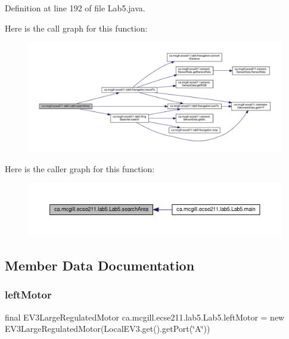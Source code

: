 Definition at line 192 of file Lab5.\+java.

Here is the call graph for this function\+:
\nopagebreak
\begin{figure}[H]
\begin{center}
\leavevmode
\includegraphics[width=350pt]{classca_1_1mcgill_1_1ecse211_1_1lab5_1_1_lab5_a0e80ac0068ef1ab41cfb571b8c65845c_cgraph}
\end{center}
\end{figure}
Here is the caller graph for this function\+:
\nopagebreak
\begin{figure}[H]
\begin{center}
\leavevmode
\includegraphics[width=350pt]{classca_1_1mcgill_1_1ecse211_1_1lab5_1_1_lab5_a0e80ac0068ef1ab41cfb571b8c65845c_icgraph}
\end{center}
\end{figure}


\subsection{Member Data Documentation}
\mbox{\label{classca_1_1mcgill_1_1ecse211_1_1lab5_1_1_lab5_a613e69d8f1e90a1161b78020571110fc}} 
\subsubsection{\texorpdfstring{left\+Motor}{leftMotor}}
{\footnotesize\ttfamily final E\+V3\+Large\+Regulated\+Motor ca.\+mcgill.\+ecse211.\+lab5.\+Lab5.\+left\+Motor = new E\+V3\+Large\+Regulated\+Motor(Local\+E\+V3.\+get().get\+Port(\char`\"{}A\char`\"{}))\hspace{0.3cm}{\ttfamily [static]}}

